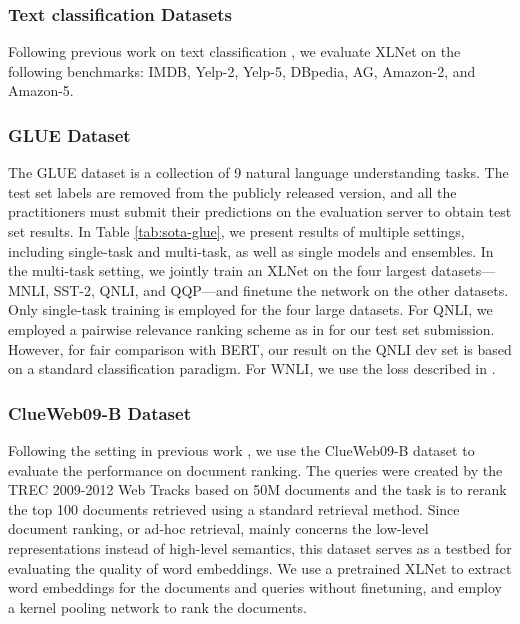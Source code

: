 \documentclass{article}
\begin{document}
\subsubsection{Text classification Datasets}

Following previous work on text classification \cite{zhang2015character,miyato2016adversarial}, we evaluate XLNet on the following benchmarks: IMDB, Yelp-2, Yelp-5, DBpedia, AG, Amazon-2, and Amazon-5.

\subsubsection{GLUE Dataset}

The GLUE dataset \cite{wang2019glue} is a collection of 9 natural language understanding tasks. 
The test set labels are removed from the publicly released version, and all the practitioners must submit their predictions on the evaluation server to obtain test set results. In Table \ref{tab:sota-glue}, we present results of multiple settings, including single-task and multi-task, as well as single models and ensembles. In the multi-task setting, we jointly train an XLNet on the four largest datasets---MNLI, SST-2, QNLI, and QQP---and finetune the network on the other datasets. Only single-task training is employed for the four large datasets. For QNLI, we employed a pairwise relevance ranking scheme as in \cite{liu2019multi} for our test set submission. However, for fair comparison with BERT, our result on the QNLI dev set is based on a standard classification paradigm. For WNLI, we use the loss described in \cite{kocijan2019surprisingly}.

\subsubsection{ClueWeb09-B Dataset}

Following the setting in previous work \cite{dai2018convolutional}, we use the ClueWeb09-B dataset to evaluate the performance on document ranking. The queries were created by the TREC 2009-2012 Web Tracks based on 50M documents and the task is to rerank the top 100 documents retrieved using a standard retrieval method. Since document ranking, or ad-hoc retrieval, mainly concerns the low-level representations instead of high-level semantics, this dataset serves as a testbed for evaluating the quality of word embeddings. We use a pretrained XLNet to extract word embeddings for the documents and queries without finetuning, and employ a kernel pooling network \cite{xiong2017end} to rank the documents.
\end{document}
